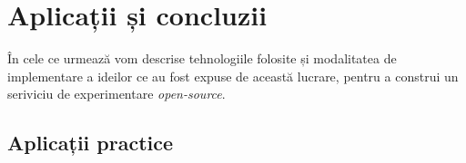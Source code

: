 \chapter{Aplicații și concluzii}

În cele ce urmează vom descrise tehnologiile folosite și modalitatea de implementare a ideilor ce au fost expuse de această lucrare, pentru a construi un seriviciu de experimentare \textit{open-source}.

\section{Aplicații practice}